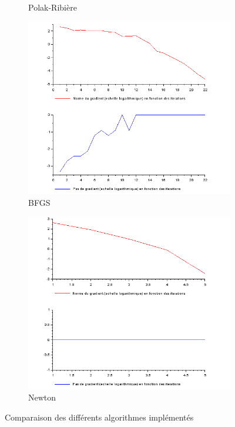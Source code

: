 \documentclass{article}
\begin{document}
\begin{figure}
\begin{subfigure}[t]{.4\textwidth}
            \caption{Polak-Ribière}
            \label{fig:Polak_Ribiere}
        \end{subfigure}
        \hfill
        \begin{subfigure}[t]{.4\textwidth}
            \includegraphics[width=\textwidth]{../Images/BFGS.png}
            \caption{BFGS}
            \label{fig:BFGS}
        \end{subfigure}
        \hfill
        \begin{subfigure}[t]{.4\textwidth}
            \includegraphics[width=\textwidth]{../Images/Newton.png}
            \caption{Newton}
            \label{fig:BFGS}
        \end{subfigure}
        \caption{Comparaison des différents algorithmes implémentés}
        \label{fig:courbes}
    \end{figure}
\end{document}
